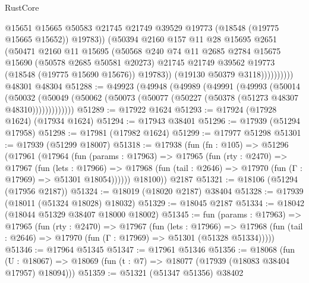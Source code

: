\begin{lexlean}{RustCore}
\begin{coremodule}
                        @15651
                        @15665
                        @50583
                        @21745
                        @21749
                        @39529
                        @19773
                        (@18548 (@19775 @15665 @15652))
                        @19783))
                    (@50394
                      @2160
                      @157
                      @11
                      @28
                      @15695
                      @2651
                      (@50471
                        @2160
                        @11
                        @15695
                        (@50568
                          @240
                          @74
                          @11
                          @2685
                          @2784
                          @15675
                          @15690
                          (@50578 @2685 @50581 @20273)
                          @21745
                          @21749
                          @39562
                          @19773
                          (@18548 (@19775 @15690 @15676))
                          @19783))
                      (@19130 @50379 @3118))))))))))
    @48301
    @48304
@51288 := @49923
    (@49948
      (@49989
        (@49991
          (@49993
            (@50014
              (@50032
                (@50049 (@50062 (@50073 (@50077 (@50227 (@50378 (@51273 @48307 @48310)))))))))))))
@51289 := @17922 @1624
@51293 := @17924 (@17928 @1624) (@17934 @1624)
@51294 := @17943 @38401
@51296 := @17939 (@51294 @17958)
@51298 := @17981 (@17982 @1624)
@51299 := @17977 @51298
@51301 := @17939 (@51299 @18007)
@51318 := @17938
    (fun (fn : @105) =>
    @51296
      (@17961
        (@17964
          (fun (params : @17963) =>
          @17965
            (fun (rty : @2470) =>
            @17967
              (fun (lets : @17966) =>
              @17968 (fun (tail : @2646) => @17970 (fun (Γ : @17969) => @51301 @18054))))))
        @18100))
    @2187
@51321 := @18106 (@51294 (@17956 @2187))
@51324 := @18019 (@18020 @2187) @38404
@51328 := @17939 (@18011 (@51324 @18028) @18032)
@51329 := @18045 @2187
@51334 := @18042 (@18044 @51329 @38407 @18000 @18002)
@51345 := fun (params : @17963) =>
  @17965
    (fun (rty : @2470) =>
    @17967
      (fun (lets : @17966) =>
      @17968 (fun (tail : @2646) => @17970 (fun (Γ : @17969) => @51301 (@51328 @51334)))))
@51346 := @17964 @51345
@51347 := @17961 @51346
@51356 := @18068
    (fun (U : @18067) => @18069 (fun (t : @7) => @18077 (@17939 (@18083 @38404 @17957) @18094)))
@51359 := @51321 (@51347 @51356) @38402

\end{coremodule}
\end{lexlean}
